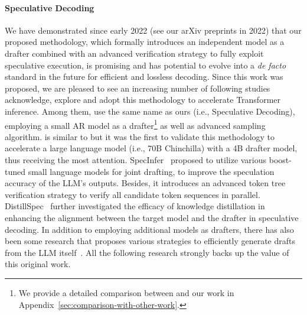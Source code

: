 \paragraph{Speculative Decoding} We have demonstrated since early 2022 (see our arXiv preprints in 2022) that our proposed methodology, which formally introduces an independent model as a drafter combined with an advanced verification strategy to fully exploit speculative execution, is promising and has potential to evolve into a \textit{de facto} standard in the future for efficient and lossless decoding. Since this work was proposed, we are pleased to see an increasing number of following studies~\cite{Leviathan:2023specdec, Chen:2023specsampling, Kim:2023bild, Spector:2023stagedspec, Zhang:2023draftverify} acknowledge, explore and adopt this methodology to accelerate Transformer inference. Among them, \citet{Leviathan:2023specdec} use the same name as ours (i.e., Speculative Decoding), employing a small AR model as a drafter\footnote{We provide a detailed comparison between \citet{Leviathan:2023specdec} and our work in Appendix~\ref{sec:comparison-with-other-work}.} as well as advanced sampling algorithm. \citet{Chen:2023specsampling} is similar to \citet{Leviathan:2023specdec} but it was the first to validate this methodology to accelerate a large language model (i.e., 70B Chinchilla) with a 4B drafter model, thus receiving the most attention. SpecInfer~\cite{Miao:2023specinfer} proposed to utilize various boost-tuned small language models for joint drafting, to improve the speculation accuracy of the LLM’s outputs. Besides, it introduces an advanced token tree verification strategy to verify all candidate token sequences in parallel. DistillSpec~\cite{Zhou:2023distillspec} further investigated the efficacy of knowledge distillation in enhancing the alignment between the target model and the drafter in speculative decoding. In addition to employing additional models as drafters, there has also been some research that proposes various strategies to efficiently generate drafts from the LLM itself~\cite{Santilli:2023paralleldecoding, Zhang:2023draftverify}. All the following research strongly backs up the value of this original work.

